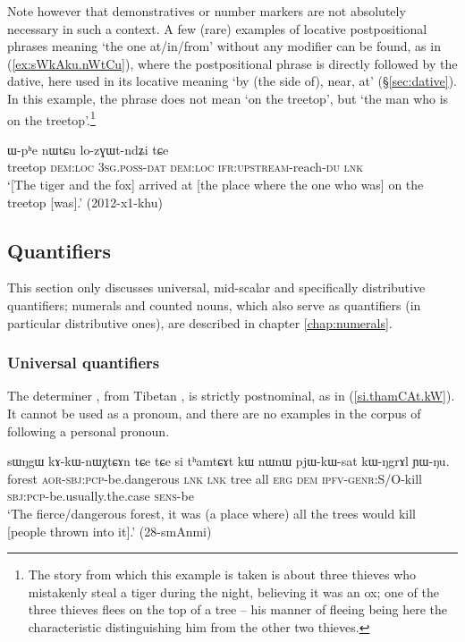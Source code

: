 Note however that demonstratives or number markers are not absolutely necessary in such a context. A few (rare) examples of locative postpositional phrases meaning `the one at/in/from' without any modifier can be found, as in (\ref{ex:sWkAku.nWtCu}), where the postpositional phrase is directly followed by the dative, here used in its locative meaning `by (the side of), near, at' (§\ref{sec:dative}). In this example, the phrase  does not mean `on the treetop', but `the man who is on the treetop'.\footnote{The story from which this example is taken is about three thieves who mistakenly steal a tiger during the night, believing it was an ox; one of the three thieves flees on the top of a tree -- his manner of fleeing being here the characteristic distinguishing him from the other two thieves.}

\begin{exe}
\ex \label{ex:sWkAku.nWtCu}
 ɯ-pʰe nɯtɕu lo-zɣɯt-ndʑi tɕe\\
treetop \textsc{dem}:\textsc{loc} \textsc{3sg}.\textsc{poss}-\textsc{dat} \textsc{dem}:\textsc{loc}  \textsc{ifr}:\textsc{upstream}-reach-\textsc{du} \textsc{lnk}\\
\glt `[The tiger and the fox] arrived at [the place where the one who was] on the treetop [was].' (2012-x1-khu)
\end{exe}

\subsection{Quantifiers} \label{sec:quantifiers.determiners}
This section only discusses universal, mid-scalar and specifically distributive quantifiers; numerals and counted nouns, which also serve as quantifiers (in particular distributive ones), are described in chapter \ref{chap:numerals}.

\subsubsection{Universal quantifiers} \label{sec:universal.quant}
The determiner , from Tibetan , is strictly postnominal, as in (\ref{si.thamCAt.kW}). It cannot be used as a pronoun, and there are no examples in the corpus of  following a personal pronoun.

\begin{exe}
\ex \label{si.thamCAt.kW}
 \gll   sɯŋgɯ kɤ-kɯ-nɯχtɕɤn tɕe tɕe si tʰamtɕɤt kɯ nɯnɯ pjɯ-kɯ-sat kɯ-ŋgrɤl ɲɯ-ŋu. \\
 forest \textsc{aor}-\textsc{sbj}:\textsc{pcp}-be.dangerous \textsc{lnk} \textsc{lnk} tree all \textsc{erg} \textsc{dem} \textsc{ipfv}-\textsc{genr}:S/O-kill  \textsc{sbj}:\textsc{pcp}-be.usually.the.case \textsc{sens}-be \\
 \glt `The fierce/dangerous forest, it was (a place where) all the trees would kill [people thrown into it].' (28-smAnmi)
\end{exe}
 
